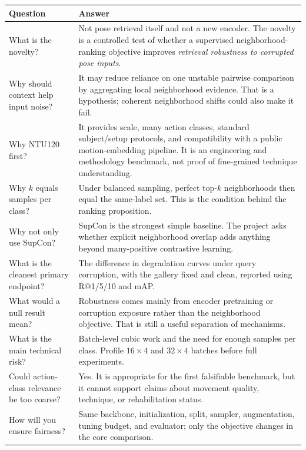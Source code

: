 \documentclass[11pt,oneside,openany]{book}
\theoremstyle{myplain}
\theoremstyle{definition}
\begin{document}
\begin{longtable}{p{}p{}}
\toprule
\textbf{Question} & \textbf{Answer} \\
\midrule
What is the novelty? & Not pose retrieval itself and not a new encoder. The novelty is a controlled test of whether a supervised neighborhood-ranking objective improves \emph{retrieval robustness to corrupted pose inputs}. \\
Why should context help input noise? & It may reduce reliance on one unstable pairwise comparison by aggregating local neighborhood evidence. That is a hypothesis; coherent neighborhood shifts could also make it fail. \\
Why NTU120 first? & It provides scale, many action classes, standard subject/setup protocols, and compatibility with a public motion-embedding pipeline. It is an engineering and methodology benchmark, not proof of fine-grained technique understanding. \\
Why $k$ equals samples per class? & Under balanced sampling, perfect top-$k$ neighborhoods then equal the same-label set. This is the condition behind the ranking proposition. \\
Why not only use SupCon? & SupCon is the strongest simple baseline. The project asks whether explicit neighborhood overlap adds anything beyond many-positive contrastive learning. \\
What is the cleanest primary endpoint? & The difference in degradation curves under query corruption, with the gallery fixed and clean, reported using R@1/5/10 and mAP. \\
What would a null result mean? & Robustness comes mainly from encoder pretraining or corruption exposure rather than the neighborhood objective. That is still a useful separation of mechanisms. \\
What is the main technical risk? & Batch-level cubic work and the need for enough samples per class. Profile $16\times4$ and $32\times4$ batches before full experiments. \\
Could action-class relevance be too coarse? & Yes. It is appropriate for the first falsifiable benchmark, but it cannot support claims about movement quality, technique, or rehabilitation status. \\
How will you ensure fairness? & Same backbone, initialization, split, sampler, augmentation, tuning budget, and evaluator; only the objective changes in the core comparison. \\
\bottomrule
\end{longtable}
\end{document}
